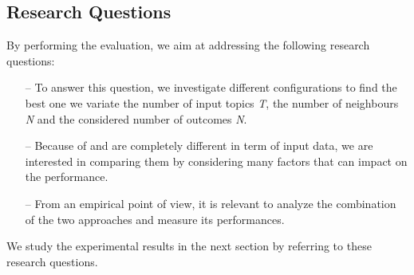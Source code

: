 %
%



\subsection{Research Questions} \label{sec:ResearchQuestions}
By performing the evaluation, we aim at addressing the following research questions:
\begin{itemize}
	\item[--] \rqfirst To answer this question, we investigate different configurations to find the best one \ie we variate the number of input topics \emph{T}, the number of neighbours \emph{N} and the considered number of outcomes \emph{N}.
	
	\item[--] \rqsecond Because of \CT and \MNB are completely different in term of input data, we are interested in comparing them by considering many factors that can impact on the performance.
	\item[--] \rqthird From an empirical point of view, it is relevant to analyze the combination of the two approaches and measure its performances.
\end{itemize}


We study the experimental results in the next section by referring to these research questions.
